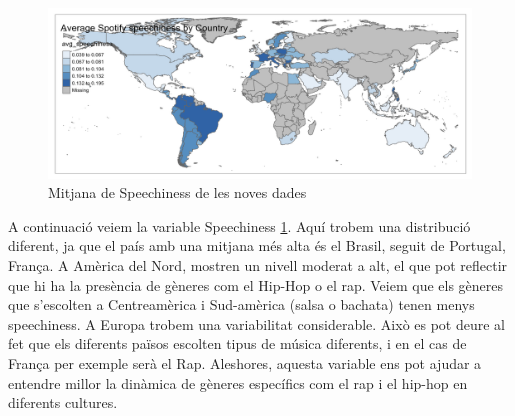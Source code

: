 \begin{figure}[H]
    \centering
    \includegraphics[width=0.7\linewidth]{Images/7_Geospatial/4_data2024/data2024_speechiness.png}
    \caption{Mitjana de Speechiness de les noves dades}
    \label{fig:geo_mean_speechiness}
\end{figure}

A continuació veiem la variable Speechiness \ref{fig:geo_mean_speechiness}. Aquí trobem una distribució diferent, ja que el país amb una mitjana més alta és el Brasil, seguit de Portugal, França. A Amèrica del Nord, mostren un nivell moderat a alt, el que pot reflectir que hi ha la presència de gèneres com el Hip-Hop o el rap. Veiem que els gèneres que s'escolten a Centreamèrica i Sud-amèrica (salsa o bachata) tenen menys speechiness. A Europa trobem una variabilitat considerable. Això es pot deure al fet que els diferents països escolten tipus de música diferents, i en el cas de França per exemple serà el Rap. Aleshores, aquesta variable ens pot ajudar a entendre millor la dinàmica de gèneres específics com el rap i el hip-hop en diferents cultures.

